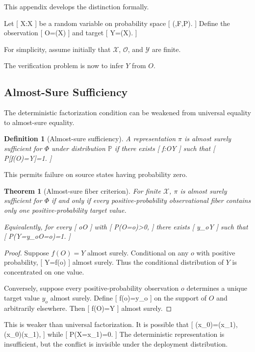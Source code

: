 \documentclass[11pt]{article}
\newtheorem{theorem}{Theorem} \newtheorem{proposition}{Proposition} \newtheorem{lemma}{Lemma} \newtheorem{corollary}{Corollary} \newtheorem{definition}{Definition} \newtheorem{remark}{Remark}
\begin{document}
This appendix develops the distinction formally.

Let
[
X:\Omega\to\mathcal X
]
be a random variable on probability space
[
(\Omega,\mathcal F,\mathbb P).
]
Define the observation
[
O=\pi(X)
]
and target
[
Y=\Phi(X).
]

For simplicity, assume initially that $\mathcal X$, $\mathcal O$, and $\mathcal Y$ are finite.

The verification problem is now to infer $Y$ from $O$.

\subsection{Almost-Sure Sufficiency}

The deterministic factorization condition can be weakened from universal equality to almost-sure equality.

\begin{definition}[Almost-sure sufficiency]
A representation $\pi$ is almost surely sufficient for $\Phi$ under distribution $\mathbb P$ if there exists
[
f:\mathcal O\to\mathcal Y
]
such that
[
\mathbb P[f(O)=Y]=1.
]
\end{definition}

This permits failure on source states having probability zero.

\begin{theorem}[Almost-sure fiber criterion]
For finite $\mathcal X$, $\pi$ is almost surely sufficient for $\Phi$ if and only if every positive-probability observational fiber contains only one positive-probability target value.

Equivalently, for every
[
o\in\mathcal O
]
with
[
\mathbb P(O=o)>0,
]
there exists
[
y_o\in\mathcal Y
]
such that
[
\mathbb P(Y=y_o\mid O=o)=1.
]
\end{theorem}

\begin{proof}
Suppose $f(O)=Y$ almost surely. Conditional on any $o$ with positive probability,
[
Y=f(o)
]
almost surely. Thus the conditional distribution of $Y$ is concentrated on one value.

Conversely, suppose every positive-probability observation $o$ determines a unique target value $y_o$ almost surely. Define
[
f(o)=y_o
]
on the support of $O$ and arbitrarily elsewhere. Then
[
f(O)=Y
]
almost surely.
\end{proof}

This is weaker than universal factorization. It is possible that
[
\pi(x_0)=\pi(x_1),
\qquad
\Phi(x_0)\neq\Phi(x_1),
]
while
[
\mathbb P(X=x_1)=0.
]
The deterministic representation is insufficient, but the conflict is invisible under the deployment distribution.
\end{document}
